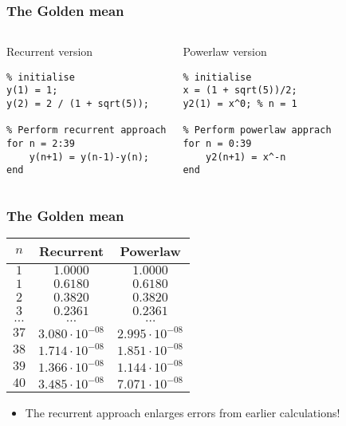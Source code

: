 \documentclass[11pt,table,final,fleqn,xcolor={usenames,dvipsnames}]{beamer}
\begin{document}
% 
\begin{frame}[fragile]
  \frametitle{The Golden mean}
  \begin{columns}[T]
      \begin{block}{Recurrent version}
        \begin{lstlisting}
% initialise
y(1) = 1;
y(2) = 2 / (1 + sqrt(5));

% Perform recurrent approach
for n = 2:39
    y(n+1) = y(n-1)-y(n);
end
        \end{lstlisting}
      \end{block}
    \pause
      \begin{block}{Powerlaw version}
        \begin{lstlisting}
% initialise
x = (1 + sqrt(5))/2;
y2(1) = x^0; % n = 1

% Perform powerlaw apprach
for n = 0:39
    y2(n+1) = x^-n
end
        \end{lstlisting}
      \end{block}
  \end{columns}
\end{frame}
% 
\begin{frame}[fragile]
  \frametitle{The Golden mean}
    \begin{longtable}{c!{\vrule}cc}
    \hline
      $n$   & Recurrent & Powerlaw \\ \hline
      $1$   & $1.0000$ & $1.0000$ \\
      $1$   & $0.6180$ & $0.6180$ \\
      $2$   & $0.3820$ & $0.3820$ \\
      $3$   & $0.2361$ & $0.2361$ \\
      $\ldots$ & $\ldots$ & $\ldots$ \\
      $37$ & $3.080\cdot10^{-08}$ & $2.995\cdot10^{-08}$ \\
      $38$ & $1.714\cdot10^{-08}$ & $1.851\cdot10^{-08}$ \\
      $39$ & $1.366\cdot10^{-08}$ & $1.144\cdot10^{-08}$ \\
      $40$ & $3.485\cdot10^{-08}$ & $7.071\cdot10^{-08}$ \\ \hline
    \end{longtable} 
    \begin{itemize}
       \item The recurrent approach enlarges errors from earlier calculations!
    \end{itemize}
\end{frame}
\end{document}
